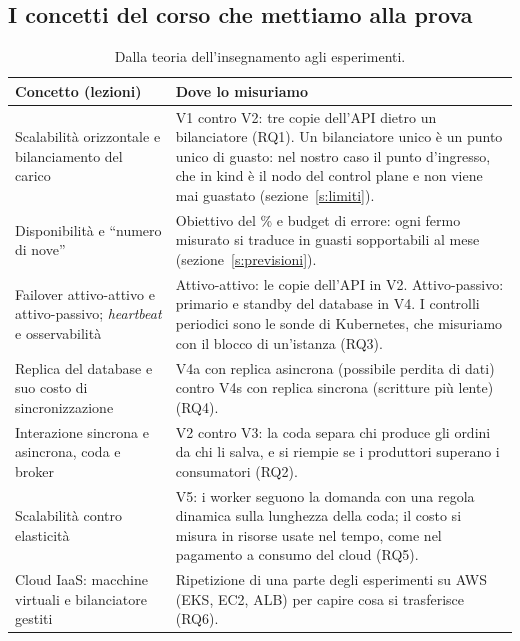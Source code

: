 \subsection{I concetti del corso che mettiamo alla prova}

\begin{table}[H]
\centering
\caption{Dalla teoria dell'insegnamento agli esperimenti.}
\label{tab:corso}
\begin{tabularx}{\linewidth}{@{}>{\raggedright\arraybackslash}p{4.6cm}L@{}}
\toprule
\textbf{Concetto (lezioni)} & \textbf{Dove lo misuriamo} \\
\midrule
Scalabilità orizzontale e bilanciamento del carico~\cite{dimartino-architetture} & V1 contro V2: tre copie dell'API dietro un bilanciatore (RQ1). Un bilanciatore unico è un punto unico di guasto: nel nostro caso il punto d'ingresso, che in kind è il nodo del control plane e non viene mai guastato (sezione~\ref{s:limiti}). \\
Disponibilità e ``numero di nove''~\cite{dimartino-architetture} & Obiettivo del \% e budget di errore: ogni fermo misurato si traduce in guasti sopportabili al mese (sezione~\ref{s:previsioni}). \\
Failover attivo-attivo e attivo-passivo; \textit{heartbeat} e osservabilità~\cite{dimartino-architetture} & Attivo-attivo: le copie dell'API in V2. Attivo-passivo: primario e standby del database in V4. I controlli periodici sono le sonde di Kubernetes, che misuriamo con il blocco di un'istanza (RQ3). \\
Replica del database e suo costo di sincronizzazione~\cite{dimartino-architetture} & V4a con replica asincrona (possibile perdita di dati) contro V4s con replica sincrona (scritture più lente) (RQ4). \\
Interazione sincrona e asincrona, coda e broker~\cite{dimartino-architetture} & V2 contro V3: la coda separa chi produce gli ordini da chi li salva, e si riempie se i produttori superano i consumatori (RQ2). \\
Scalabilità contro elasticità~\cite{starace-elasticita} & V5: i worker seguono la domanda con una regola dinamica sulla lunghezza della coda; il costo si misura in risorse usate nel tempo, come nel pagamento a consumo del cloud (RQ5). \\
Cloud IaaS: macchine virtuali e bilanciatore gestiti~\cite{starace-elasticita} & Ripetizione di una parte degli esperimenti su AWS (EKS, EC2, ALB) per capire cosa si trasferisce (RQ6). \\
\bottomrule
\end{tabularx}
\end{table}

